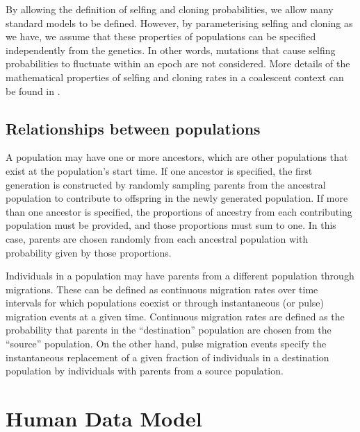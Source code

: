 \documentclass[11pt]{article}
\newcommand{\mhcomment}[1]{{\textcolor{cyan}{MH: #1}}}
\begin{document}
By allowing the definition of selfing and cloning probabilities, we allow many
standard models to be defined.
However, by parameterising selfing and cloning as we have, we assume that these
properties of populations can be specified independently from the genetics.
In other words, mutations that cause selfing probabilities to fluctuate within
an epoch are not considered.
More details of the mathematical properties of selfing and cloning rates
in a coalescent context can be found in
\citet{nordborg1997coalescent,hartfield2016facsexcoal}.


\subsection{Relationships between populations}

A population may have one
or more ancestors, which are other populations that exist at the population's
start time. If one ancestor is specified, the first generation is constructed
by randomly sampling parents from the ancestral population to contribute to
offspring in the newly generated population. If more than one ancestor is
specified, the proportions of ancestry from each contributing population must
be provided, and those proportions must sum to one. In this case, parents are
chosen randomly from each ancestral population with probability given by those
proportions.

Individuals in a population may have parents from a different
population through migrations. These can be defined as continuous migration
rates over time intervals for which populations coexist or through
instantaneous (or pulse) migration events at a given time. Continuous migration
rates are defined as the probability that parents in the ``destination''
population are chosen from the ``source'' population.
On the other hand, pulse
migration events specify the instantaneous replacement of a given fraction of
individuals in a destination population by individuals with parents from a
source population.


\section{Human Data Model}\label{sec:appendix-spec}
\end{document}
